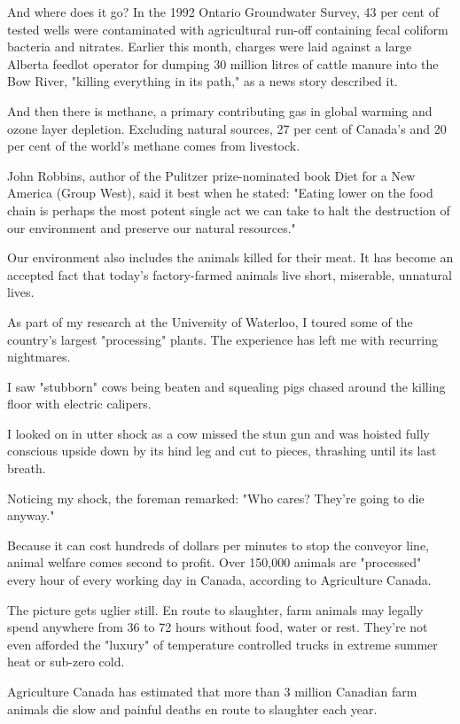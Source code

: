 \documentclass[a4paper]{article}
\begin{document}
And where does it go? In the 1992 Ontario Groundwater Survey, 43 per cent of tested wells were contaminated with agricultural run-off containing fecal coliform bacteria and nitrates. Earlier this month, charges were laid against a large Alberta feedlot operator for dumping 30 million litres of cattle manure into the Bow River, "killing everything in its path," as a news story described it.

And then there is methane, a primary contributing gas in global warming and ozone layer depletion. Excluding natural sources, 27 per cent of Canada's and 20 per cent of the world's methane comes from livestock.

John Robbins, author of the Pulitzer prize-nominated book Diet for a New America (Group West), said it best when he stated: "Eating lower on the food chain is perhaps the most potent single act we can take to halt the destruction of our environment and preserve our natural resources."

Our environment also includes the animals killed for their meat. It has become an accepted fact that today's factory-farmed animals live short, miserable, unnatural lives.

As part of my research at the University of Waterloo, I toured some of the country's largest "processing" plants. The experience has left me with recurring nightmares.

I saw "stubborn" cows being beaten and squealing pigs chased around the killing floor with electric calipers.

I looked on in utter shock as a cow missed the stun gun and was hoisted fully conscious upside down by its hind leg and cut to pieces, thrashing until its last breath.

Noticing my shock, the foreman remarked: "Who cares? They're going to die anyway."

Because it can cost hundreds of dollars per minutes to stop the conveyor line, animal welfare comes second to profit. Over 150,000 animals are "processed" every hour of every working day in Canada, according to Agriculture Canada.

The picture gets uglier still. En route to slaughter, farm animals may legally spend anywhere from 36 to 72 hours without food, water or rest. They're not even afforded the "luxury" of temperature controlled trucks in extreme summer heat or sub-zero cold. 

Agriculture Canada has estimated that more than 3 million Canadian farm animals die slow and painful deaths en route to slaughter each year.
\end{document}
